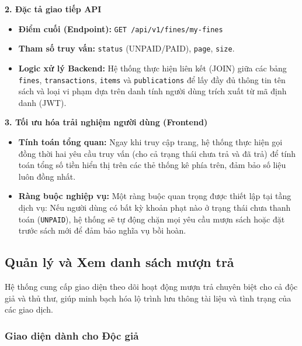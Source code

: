 \noindent\textbf{2. Đặc tả giao tiếp API}
\begin{itemize}
    \item \textbf{Điểm cuối (Endpoint):} \texttt{GET /api/v1/fines/my-fines}
    \item \textbf{Tham số truy vấn:} \texttt{status} (UNPAID/PAID), \texttt{page}, \texttt{size}.
    \item \textbf{Logic xử lý Backend:} Hệ thống thực hiện liên kết (JOIN) giữa các bảng \texttt{fines}, \texttt{transactions}, \texttt{items} và \texttt{publications} để lấy đầy đủ thông tin tên sách và loại vi phạm dựa trên danh tính người dùng trích xuất từ mã định danh (JWT).
\end{itemize}

\noindent\textbf{3. Tối ưu hóa trải nghiệm người dùng (Frontend)}
\begin{itemize}
    \item \textbf{Tính toán tổng quan:} Ngay khi truy cập trang, hệ thống thực hiện gọi đồng thời hai yêu cầu truy vấn (cho cả trạng thái chưa trả và đã trả) để tính toán tổng số tiền hiển thị trên các thẻ thống kê phía trên, đảm bảo số liệu luôn đồng nhất.
    \item \textbf{Ràng buộc nghiệp vụ:} Một ràng buộc quan trọng được thiết lập tại tầng dịch vụ: Nếu người dùng có bất kỳ khoản phạt nào ở trạng thái chưa thanh toán (\texttt{UNPAID}), hệ thống sẽ tự động chặn mọi yêu cầu mượn sách hoặc đặt trước sách mới để đảm bảo nghĩa vụ bồi hoàn.
\end{itemize}



\subsection{Quản lý và Xem danh sách mượn trả}

Hệ thống cung cấp giao diện theo dõi hoạt động mượn trả chuyên biệt cho cả độc giả và thủ thư, giúp minh bạch hóa lộ trình lưu thông tài liệu và tình trạng của các giao dịch.

\subsubsection{Giao diện dành cho Độc giả}

